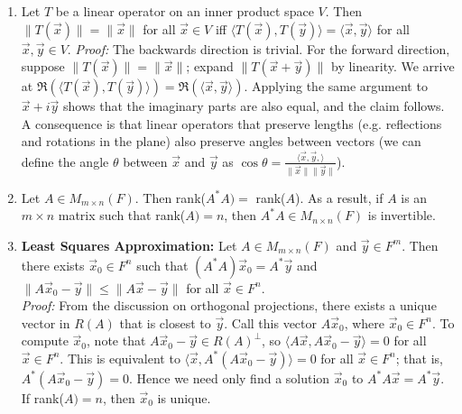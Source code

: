 \documentclass[10pt]{article}
\begin{document}
\begin{multicols*}{2}
\begin{enumerate}
\begin{enumerate}
        \item Let $T$ be a linear operator on an inner product space $V$. Then $\| T(\vec{x}) \| = \| \vec{x} \|$ for all $\vec{x} \in V$ iff $\langle T(\vec{x}), T(\vec{y}) \rangle = \langle \vec{x}, \vec{y} \rangle$ for all $\vec{x}, \vec{y} \in V$. \textit{Proof:} The backwards direction is trivial. For the forward direction, suppose $\| T(\vec{x}) \| = \| \vec{x} \|$; expand $\| T(\vec{x} + \vec{y}) \|$ by linearity. We arrive at $\Re( \langle T(\vec{x}), T(\vec{y}) \rangle ) = \Re ( \langle \vec{x}, \vec{y} \rangle )$. Applying the same argument to $\vec{x}+i\vec{y}$ shows that the imaginary parts are also equal, and the claim follows. A consequence is that linear operators that preserve lengths (e.g. reflections and rotations in the plane) also preserve angles between vectors (we can define the angle $\theta$ between $\vec{x}$ and $\vec{y}$ as $\cos{\theta} = \frac{\langle \vec{x}, \vec{y}, \rangle}{\| \vec{x} \| \| \vec{y} \|}$).
        
        \item Let $A \in M_{m \times n}(F)$. Then rank($A^*A) =$ rank($A$). As a result, if $A$ is an $m\times n$ matrix such that rank($A)=n$, then $A^*A \in M_{n \times n}(F)$ is invertible. 
        
        \item \textbf{Least Squares Approximation:} Let $A \in M_{m \times n}(F)$ and $\vec{y} \in F^m$. Then there exists $\vec{x}_0 \in F^n$ such that $(A^*A)\vec{x}_0 = A^*\vec{y}$ and $\| A\vec{x}_0 - \vec{y} \| \leq \| A\vec{x} - \vec{y} \|$ for all $\vec{x} \in F^n$. \\
        \textit{Proof:} From the discussion on orthogonal projections, there exists a unique vector in $R(A)$ that is closest to $\vec{y}$. Call this vector $A\vec{x}_0$, where $\vec{x}_0 \in F^n$. To compute $\vec{x}_0$, note that $A\vec{x}_0 - \vec{y} \in R(A)^\perp$, so $\langle A\vec{x}, A\vec{x}_0 - \vec{y} \rangle = 0$ for all $\vec{x} \in F^n$. This is equivalent to $\langle \vec{x}, A^*(A\vec{x}_0 - \vec{y}) \rangle = 0$ for all $\vec{x} \in F^n$; that is, $A^*(A\vec{x}_0 - \vec{y})=0$. Hence we need only find a solution $\vec{x}_0$ to $A^*A\vec{x} = A^*\vec{y}$. If rank($A)=n$, then $\vec{x}_0$ is unique.
        

\end{enumerate}
\end{enumerate}
\end{multicols*}
\end{document}

